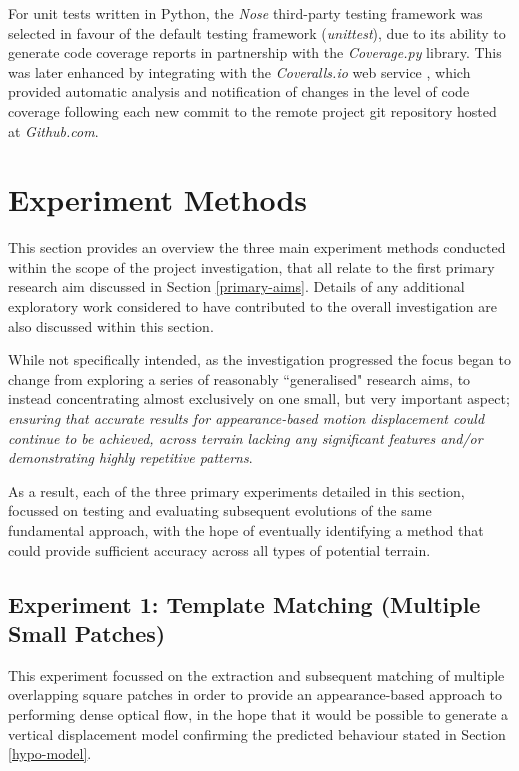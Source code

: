 For unit tests written in Python, the \textit{Nose} \cite{nose} third-party testing framework was selected in favour of the default testing framework (\textit{unittest}), due to its ability to generate code coverage reports in partnership with the \textit{Coverage.py} \cite{coverage} library. This was later enhanced by integrating with the \textit{Coveralls.io} web service \cite{coveralls}, which provided automatic analysis and notification of changes in the level of code coverage following each new commit to the remote project git repository hosted at \textit{Github.com}.

\section{Experiment Methods}

This section provides an overview the three main experiment methods conducted within the scope of the project investigation, that all relate to the first primary research aim discussed in Section \ref{primary-aims}. Details of any additional exploratory work considered to have contributed to the overall investigation are also discussed within this section.

While not specifically intended, as the investigation progressed the focus began to change from  exploring a series of reasonably ``generalised" research aims, to instead concentrating almost exclusively on one small, but very important aspect; \textit{ensuring that accurate results for appearance-based motion displacement could continue to be achieved, across terrain lacking any significant features and/or demonstrating highly repetitive patterns}.

  As a result, each of the three primary experiments detailed in this section, focussed on testing and evaluating subsequent evolutions of the same fundamental approach, with the hope of eventually identifying a method that could provide sufficient accuracy across all types of potential terrain. 
  
\subsection{Experiment 1: Template Matching (Multiple Small Patches)}
\label{ex1}

This experiment focussed on the extraction and subsequent matching of multiple overlapping square patches in order to provide an appearance-based approach to performing dense optical flow, in the hope that it would be possible to generate a vertical displacement model confirming the predicted behaviour stated in Section \ref{hypo-model}. 

